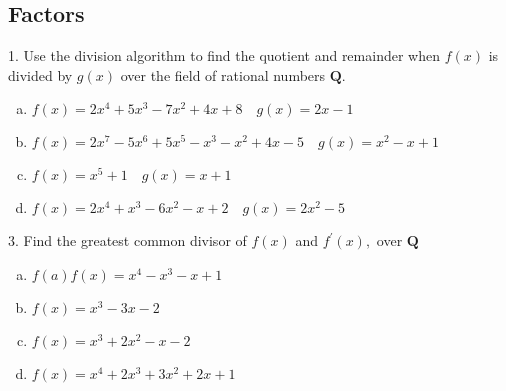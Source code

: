 \subsection{Factors}
\begin{mdframed}[style=darkQuesion]
1. Use the division algorithm to find the quotient and remainder when $f(x)$ is divided by $g(x)$ over the field of rational numbers $\mathbf{Q}$.
\begin{enumerate}[(a)]
\item{$f(x)=2 x^{4}+5 x^{3}-7 x^{2}+4 x+8 \quad g(x)=2 x-1$}
\item{$f(x)=2 x^{7}-5 x^{6}+5 x^{5}-x^{3}-x^{2}+4 x-5 \quad g(x)=x^{2}-x+1$}
\item{$f(x)=x^{5}+1 \quad g(x)=x+1$}
\item{$f(x)=2 x^{4}+x^{3}-6 x^{2}-x+2 \quad g(x)=2 x^{2}-5$}
\end{enumerate}
\end{mdframed}
\begin{mdframed}[style=darkAnswer,frametitle={Joe Starr}]
\end{mdframed}
\newpage
\begin{mdframed}[style=darkQuesion]
  3. Find the greatest common divisor of $f(x)$ and $f^{\prime}(x),$ over $\mathbf{Q}$
  \begin{enumerate}[(a)]
  \item{$f(a) f(x)=x^{4}-x^{3}-x+1$}
  \item{$f(x)=x^{3}-3 x-2$}
  \item{$f(x)=x^{3}+2 x^{2}-x-2$}
  \item{$f(x)=x^{4}+2 x^{3}+3 x^{2}+2 x+1$}
  \end{enumerate} 
\end{mdframed}
